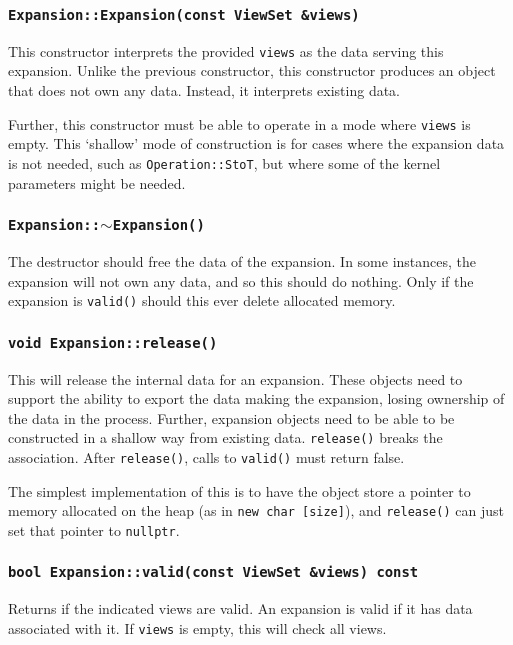 \subsubsection{\texttt{Expansion::Expansion(const ViewSet \&views)}}

This constructor interprets the provided \texttt{views} as the data serving
this expansion. Unlike the previous constructor, this constructor produces an
object that does not own any data. Instead, it interprets existing data.

Further, this constructor must be able to operate in a mode where \texttt{views}
is empty. This `shallow' mode of construction is for cases where the
expansion data is not needed, such as \texttt{Operation::StoT}, but where
some of the kernel parameters might be needed.

\subsubsection{\texttt{Expansion::$\sim$Expansion()}}

The destructor should free the data of the expansion. In some instances, the
expansion will not own any data, and so this should do nothing. Only if the
expansion is \texttt{valid()} should this ever delete allocated memory.

\subsubsection{\texttt{void Expansion::release()}}

This will release the internal data for an expansion. These objects need to
support the ability to export the data making the expansion, losing ownership
of the data in the process. Further, expansion objects need to be able to be
constructed in a shallow way from existing data. \texttt{release()} breaks the
association. After \texttt{release()}, calls to \texttt{valid()} must return
false.

The simplest implementation of this is to have the object store a pointer to
memory allocated on the heap (as in \texttt{new char [size]}), and
\texttt{release()} can just set that pointer to \texttt{nullptr}.

\subsubsection{\texttt{bool Expansion::valid(const ViewSet \&views) const}}

Returns if the indicated views are valid. An expansion is valid if it has
data associated with it. If \texttt{views} is empty, this will check all
views.

